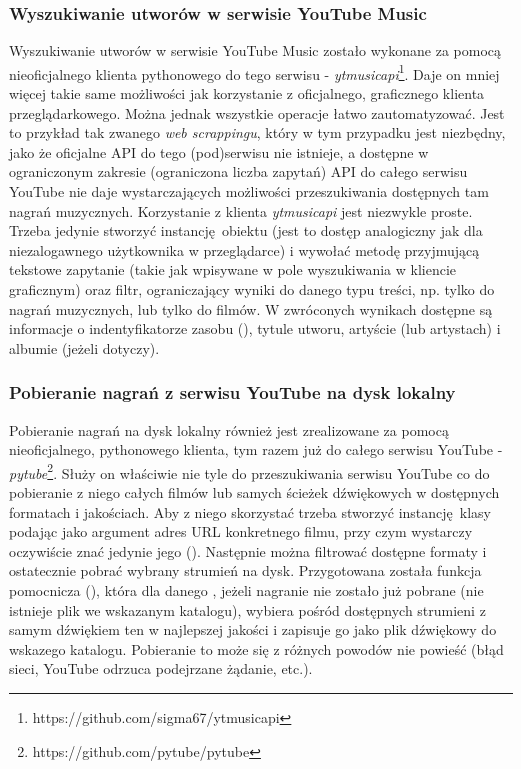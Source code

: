 \subsubsection{Wyszukiwanie utworów w serwisie YouTube Music}
Wyszukiwanie utworów w serwisie YouTube Music zostało wykonane za pomocą nieoficjalnego klienta
pythonowego do tego serwisu - \emph{ytmusicapi}\footnote{https://github.com/sigma67/ytmusicapi}.
Daje on mniej więcej takie same możliwości jak korzystanie z oficjalnego, graficznego klienta
przeglądarkowego. Można jednak wszystkie operacje łatwo zautomatyzować. Jest to przykład tak zwanego
\emph{web scrappingu}, który w tym przypadku jest niezbędny, jako że oficjalne API do tego (pod)serwisu
nie istnieje, a dostępne w ograniczonym zakresie (ograniczona liczba zapytań) API do całego serwisu
YouTube nie daje wystarczających możliwości przeszukiwania dostępnych tam nagrań muzycznych.
Korzystanie z klienta \emph{ytmusicapi} jest niezwykle proste. Trzeba jedynie stworzyć
instancję obiektu  (jest to dostęp analogiczny jak dla niezalogawnego użytkownika w
przeglądarce) i wywołać metodę  przyjmującą tekstowe zapytanie (takie jak wpisywane w
pole wyszukiwania w kliencie graficznym) oraz filtr, ograniczający wyniki do danego typu treści, np.
tylko do nagrań muzycznych, lub tylko do filmów. W zwróconych wynikach dostępne są informacje o
indentyfikatorze zasobu (), tytule utworu, artyście (lub artystach) i albumie
(jeżeli dotyczy).

\subsubsection{Pobieranie nagrań z serwisu YouTube na dysk lokalny}
Pobieranie nagrań na dysk lokalny również jest zrealizowane za pomocą nieoficjalnego, pythonowego
klienta, tym razem już do całego serwisu YouTube -
\emph{pytube}\footnote{https://github.com/pytube/pytube}. Służy on właściwie nie tyle do
przeszukiwania serwisu YouTube co do pobieranie z niego całych filmów lub samych ścieżek dźwiękowych
w dostępnych formatach i jakościach. Aby z niego skorzystać trzeba stworzyć instancję klasy
 podając jako argument adres URL konkretnego filmu, przy czym wystarczy oczywiście
znać jedynie jego  (). Następnie
można filtrować dostępne formaty i ostatecznie pobrać wybrany strumień na dysk. Przygotowana została
funkcja pomocnicza (), która dla danego ,
jeżeli nagranie nie zostało już pobrane (nie istnieje plik we wskazanym katalogu), wybiera pośród
dostępnych strumieni z samym dźwiękiem ten w najlepszej jakości i zapisuje go jako plik dźwiękowy do
wskazego katalogu. Pobieranie to może się z różnych powodów nie powieść (błąd sieci, YouTube odrzuca
podejrzane żądanie, etc.).


